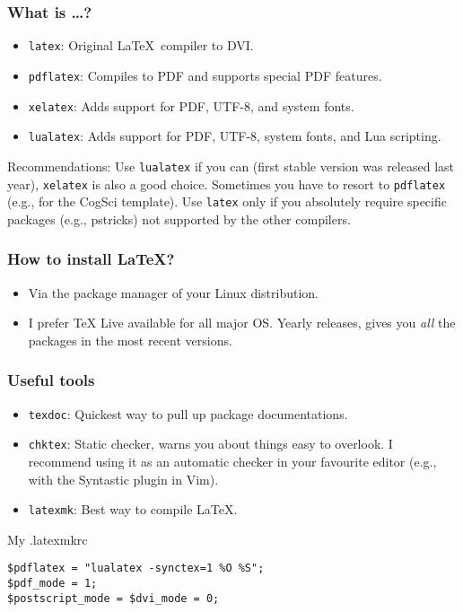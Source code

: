 \documentclass{beamer}
\begin{document}
\begin{frame}
    \frametitle{What is \dots?}
    \begin{itemize}
        \item \texttt{latex}: Original \LaTeX\ compiler to DVI\@.
        \item \texttt{pdflatex}: Compiles to PDF and supports special PDF features.
        \item \texttt{xelatex}: Adds support for PDF, UTF-8, and system fonts.
        \item \texttt{lualatex}: Adds support for PDF, UTF-8, system fonts, and Lua scripting.
    \end{itemize}
    Recommendations: Use \texttt{lualatex} if you can (first stable version was released last year), \texttt{xelatex} is also a good choice. Sometimes you have to resort to \texttt{pdflatex} (e.g., for the CogSci template). Use \texttt{latex} only if you absolutely require specific packages (e.g., pstricks) not supported by the other compilers.
\end{frame}
    
\begin{frame}
    \frametitle{How to install \LaTeX?}
    \begin{itemize}
        \item Via the package manager of your Linux distribution.
        \item I prefer TeX Live available for all major OS\@. Yearly releases, gives you \emph{all} the packages in the most recent versions.
    \end{itemize}
\end{frame}

\begin{frame}[fragile]
    \frametitle{Useful tools}
    \begin{itemize}
        \item \texttt{texdoc}: Quickest way to pull up package documentations.
        \item \texttt{chktex}: Static checker, warns you about things easy to overlook. I recommend using it as an automatic checker in your favourite editor (e.g., with the Syntastic plugin in Vim).
        \item \texttt{latexmk}: Best way to compile \LaTeX.
    \end{itemize}
    \begin{beamerboxesrounded}{My .latexmkrc}
        \begin{verbatim}
$pdflatex = "lualatex -synctex=1 %O %S";
$pdf_mode = 1;
$postscript_mode = $dvi_mode = 0;
        \end{verbatim}
    \end{beamerboxesrounded}
\end{frame}



\end{document}
